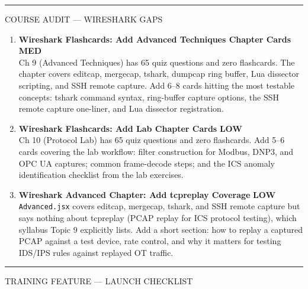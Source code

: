 \documentclass[10pt]{article}
\newcommand{\med}{\textcolor{samber}{\small\bfseries MED}}
\newcommand{\low}{\textcolor{sgreen}{\small\bfseries LOW}}
\begin{document}
\smallskip
{\color{snavy}\rule{\linewidth}{0.4pt}}
\smallskip

{\small\sffamily\color{sgray}\MakeUppercase{Course Audit — Wireshark Gaps}}
\smallskip

\begin{enumerate}[resume]\small
  \item \textbf{Wireshark Flashcards: Add Advanced Techniques Chapter Cards} \hfill \med \\
    Ch 9 (Advanced Techniques) has 65 quiz questions and zero flashcards. The chapter covers editcap, mergecap, tshark, dumpcap ring buffer, Lua dissector scripting, and SSH remote capture. Add 6--8 cards hitting the most testable concepts: tshark command syntax, ring-buffer capture options, the SSH remote capture one-liner, and Lua dissector registration.

  \item \textbf{Wireshark Flashcards: Add Lab Chapter Cards} \hfill \low \\
    Ch 10 (Protocol Lab) has 65 quiz questions and zero flashcards. Add 5--6 cards covering the lab workflow: filter construction for Modbus, DNP3, and OPC UA captures; common frame-decode steps; and the ICS anomaly identification checklist from the lab exercises.

  \item \textbf{Wireshark Advanced Chapter: Add tcpreplay Coverage} \hfill \low \\
    \texttt{Advanced.jsx} covers editcap, mergecap, tshark, and SSH remote capture but says nothing about tcpreplay (PCAP replay for ICS protocol testing), which syllabus Topic 9 explicitly lists. Add a short section: how to replay a captured PCAP against a test device, rate control, and why it matters for testing IDS/IPS rules against replayed OT traffic.
\end{enumerate}

\smallskip
{\color{snavy}\rule{\linewidth}{0.4pt}}
\smallskip

{\small\sffamily\color{sgray}\MakeUppercase{Training Feature — Launch Checklist}}
\smallskip
\end{document}
